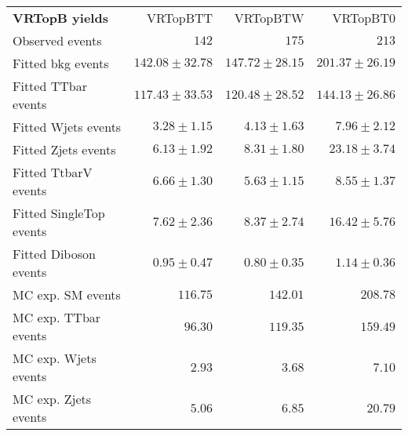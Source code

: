 

\begin{table}
\begin{center}
\setlength{\tabcolsep}{0.0pc}
{\small
\begin{tabular*}{\textwidth}{@{\extracolsep{\fill}}lrrr}
\noalign{\smallskip}\hline\noalign{\smallskip}
{\bf VRTopB yields}           & VRTopBTT            & VRTopBTW            & VRTopBT0              \\[-0.05cm]
\noalign{\smallskip}\hline\noalign{\smallskip}
Observed events          & $142$              & $175$              & $213$                    \\
\noalign{\smallskip}\hline\noalign{\smallskip}
Fitted bkg events         & $142.08 \pm 32.78$          & $147.72 \pm 28.15$          & $201.37 \pm 26.19$              \\
\noalign{\smallskip}\hline\noalign{\smallskip}
        Fitted TTbar events         & $117.43 \pm 33.53$          & $120.48 \pm 28.52$          & $144.13 \pm 26.86$              \\
        Fitted Wjets events         & $3.28 \pm 1.15$          & $4.13 \pm 1.63$          & $7.96 \pm 2.12$              \\
        Fitted Zjets events         & $6.13 \pm 1.92$          & $8.31 \pm 1.80$          & $23.18 \pm 3.74$              \\
        Fitted TtbarV events         & $6.66 \pm 1.30$          & $5.63 \pm 1.15$          & $8.55 \pm 1.37$              \\
        Fitted SingleTop events         & $7.62 \pm 2.36$          & $8.37 \pm 2.74$          & $16.42 \pm 5.76$              \\
        Fitted Diboson events         & $0.95 \pm 0.47$          & $0.80 \pm 0.35$          & $1.14 \pm 0.36$              \\
 \noalign{\smallskip}\hline\noalign{\smallskip}
MC exp. SM events              & $116.75$          & $142.01$          & $208.78$              \\
\noalign{\smallskip}\hline\noalign{\smallskip}
        MC exp. TTbar events         & $96.30$          & $119.35$          & $159.49$              \\
        MC exp. Wjets events         & $2.93$          & $3.68$          & $7.10$              \\
        MC exp. Zjets events         & $5.06$          & $6.85$          & $20.79$              \\

\end{tabular*}}
\end{center}
\end{table}
